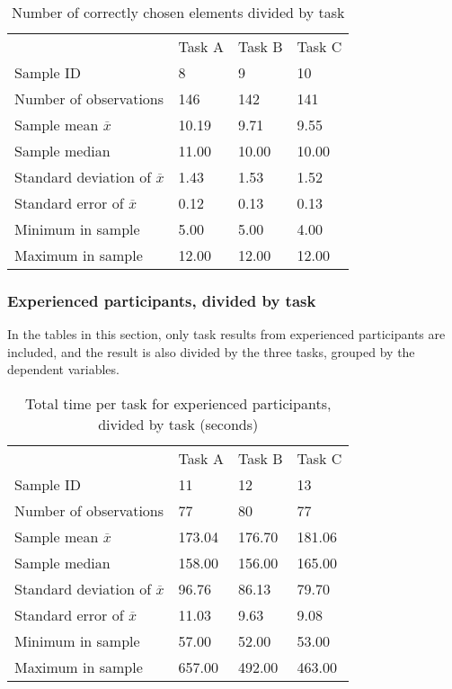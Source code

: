 \begin{table}[H]
	\centering
	\begin{tabular}{l|l|l|l}
		& Task A & Task B & Task C\\ 
		Sample ID & 8  & 9  & 10   \\ \hline
		Number of observations & 146    & 142     & 141        \\
		Sample mean $\overline{x}$ & 10.19  &  9.71  &   9.55   \\
		Sample median & 11.00 &  10.00  &  10.00   \\
		Standard deviation of $\overline{x}$ & 1.43  & 1.53 & 1.52    \\
		Standard error of $\overline{x}$ & 0.12 &  0.13 & 0.13  \\
		Minimum in sample  & 5.00  & 5.00  &   4.00  \\
		Maximum in sample  & 12.00 & 12.00  & 12.00 \\ \hline
	\end{tabular}
	\caption[Correct elements, divided by task]{Number of correctly chosen elements divided by task}
	\label{tab:totalcorrect_tasks}
\end{table}

\subsubsection{Experienced participants, divided by task}\label{sec:taskdivided_experienced}

In the tables in this section, only task results from experienced participants are included, and the result is also divided by the three tasks, grouped by the dependent variables.

\begin{table}[H]
	\centering
	\begin{tabular}{l|l|l|l}
		 & Task A & Task B & Task C \\ 
		Sample ID & 11  & 12  & 13   \\ \hline
		Number of observations & 77  & 80   & 77  \\
		Sample mean $\overline{x}$  & 173.04  &  176.70  &  181.06   \\
		Sample median  & 158.00  &  156.00  &  165.00  \\
		Standard deviation of $\overline{x}$ & 96.76  & 86.13  & 79.70   \\
		Standard error of $\overline{x}$ & 11.03 & 9.63 & 9.08  \\
		Minimum in sample   & 57.00  & 52.00 &  53.00  \\
		Maximum in sample  & 657.00 & 492.00  & 463.00 \\ \hline
	\end{tabular}
	\caption[Total time, divided by task, only experienced]{Total time per task for experienced participants, divided by task (seconds)}
	\label{tab:totaltime_tasks_experienced}
\end{table}

